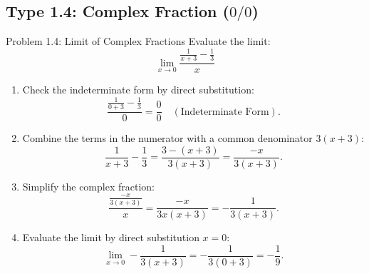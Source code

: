 \documentclass[11pt,a4paper]{article}
\begin{document}
\subsection{Type 1.4: Complex Fraction ($0/0$)}
\begin{problembox}{Problem 1.4: Limit of Complex Fractions}
Evaluate the limit:
\[
\lim_{x \to 0} \frac{\frac{1}{x + 3} - \frac{1}{3}}{x}
\]
\end{problembox}
\begin{solutionbox}
\begin{enumerate}
	\item [Step 1.] Check the indeterminate form by direct substitution:
	\begin{equation*}
		\frac{\frac{1}{0 + 3} - \frac{1}{3}}{0} = \frac{0}{0} \quad (\text{Indeterminate Form}).
	\end{equation*}
	
	\item [Step 2.] Combine the terms in the numerator with a common denominator $3(x + 3)$:
	\begin{equation*}
		\frac{1}{x + 3} - \frac{1}{3} = \frac{3 - (x + 3)}{3(x + 3)} = \frac{-x}{3(x + 3)}.
	\end{equation*}

	\item [Step 3.] Simplify the complex fraction:
	\begin{equation*}
		\frac{\frac{-x}{3(x + 3)}}{x} = \frac{-x}{3x(x + 3)} = -\frac{1}{3(x + 3)}.
	\end{equation*}

	\item [Step 4.] Evaluate the limit by direct substitution $x = 0$:
	\begin{equation*}
		\lim_{x \to 0} -\frac{1}{3(x + 3)} = -\frac{1}{3(0 + 3)} = -\frac{1}{9}.
	\end{equation*}
\end{enumerate}
\end{solutionbox}
\end{document}
